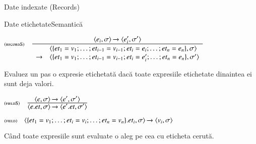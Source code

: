 \documentclass[xcolor=pdftex,romanian,colorlinks]{beamer}
\begin{document}
\begin{section}{Date indexate (Records)}
\begin{frame}{Date etichetate}{Semantică}
\begin{itemize}
\vitem[] $\reg[recordS]{\begin{array}{ll}&\c{\{{\it et}_1 = v_1;\ldots;{\it et}_{i-1}=v_{i-1};{\it et}_i = e_i;\ldots;{\it et}_{n}=e_{n}\},\sigma}\\\rightarrow&\c{\{{\it et}_1 = v_1;\ldots;{\it et}_{i-1}=v_{i-1};{\it et}_i = e_i';\ldots;{\it et}_{n}=e_{n}\},\sigma'}\end{array}}{\Ss{\c{e_i,\sigma}}{\c{e_i',\sigma'}}}{}$

Evaluez un pas o expresie etichetată dacă toate expresiile etichetate dinaintea ei sunt deja valori.

\vitem[] $\reg[fieldS]{\Ss{\c{e.{\it et},\sigma}}{\c{e'.{\it et},\sigma'}}}{\Ss{\c{e,\sigma}}{\c{e',\sigma'}}}{}$

\vitem[] $\reg[field]{\Ss{\c{\{{\it et}_1 = v_1;\ldots;{\it et}_i = v_i;\ldots;{\it et}_{n}=v_{n}\}.{\it et}_i,\sigma}}{\c{v_i,\sigma}}}{}{}$ 

Când toate expresiile sunt evaluate o aleg pe cea cu eticheta cerută.

\end{itemize}
\end{frame}
\end{section}
\end{document}
